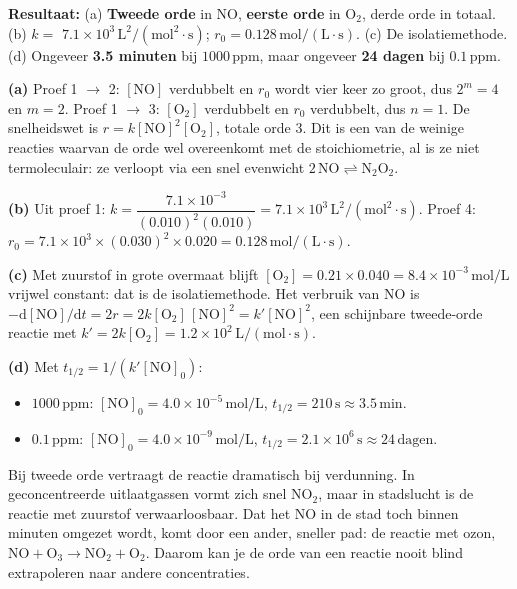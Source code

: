 \begin{oplossing}
\textbf{Resultaat:} (a) \textbf{Tweede orde} in NO, \textbf{eerste orde} in \(\mathrm{O_2}\), derde orde in totaal. (b) \(k =\) \textbf{\(7.1\times10^{3}\,\mathrm{L^2/(mol^2\cdot s)}\)}; \(r_0 = 0.128\,\mathrm{mol/(L\cdot s)}\). (c) De isolatiemethode. (d) Ongeveer \textbf{3.5 minuten} bij \(1000\,\mathrm{ppm}\), maar ongeveer \textbf{24 dagen} bij \(0.1\,\mathrm{ppm}\).

\textbf{(a)} Proef 1 \ensuremath{\rightarrow{}} 2: \([\mathrm{NO}]\) verdubbelt en \(r_0\) wordt vier keer zo groot, dus \(2^m = 4\) en \(m = 2\). Proef 1 \ensuremath{\rightarrow{}} 3: \([\mathrm{O_2}]\) verdubbelt en \(r_0\) verdubbelt, dus \(n = 1\). De snelheidswet is \(r = k[\mathrm{NO}]^2[\mathrm{O_2}]\), totale orde \(3\). Dit is een van de weinige reacties waarvan de orde wel overeenkomt met de stoichiometrie, al is ze niet termoleculair: ze verloopt via een snel evenwicht \(\mathrm{2\,NO \rightleftharpoons N_2O_2}\).

\textbf{(b)} Uit proef 1: \(k = \dfrac{7.1\times10^{-3}}{(0.010)^2(0.010)} = 7.1\times10^{3}\,\mathrm{L^2/(mol^2\cdot s)}\). Proef 4: \(r_0 = 7.1\times10^{3} \times (0.030)^2 \times 0.020 = 0.128\,\mathrm{mol/(L\cdot s)}\).

\textbf{(c)} Met zuurstof in grote overmaat blijft \([\mathrm{O_2}] = 0.21 \times 0.040 = 8.4\times10^{-3}\,\mathrm{mol/L}\) vrijwel constant: dat is de isolatiemethode. Het verbruik van NO is \(-\mathrm{d}[\mathrm{NO}]/\mathrm{d}t = 2r = 2k[\mathrm{O_2}]\,[\mathrm{NO}]^2 = k'[\mathrm{NO}]^2\), een schijnbare tweede-orde reactie met \(k' = 2k[\mathrm{O_2}] = 1.2\times10^{2}\,\mathrm{L/(mol\cdot s)}\).

\textbf{(d)} Met \(t_{1/2} = 1/(k'[\mathrm{NO}]_0)\):

\begin{itemize}
\item
  \(1000\,\mathrm{ppm}\): \([\mathrm{NO}]_0 = 4.0\times10^{-5}\,\mathrm{mol/L}\), \(t_{1/2} = 210\,\mathrm{s} \approx 3.5\,\mathrm{min}\).
\item
  \(0.1\,\mathrm{ppm}\): \([\mathrm{NO}]_0 = 4.0\times10^{-9}\,\mathrm{mol/L}\), \(t_{1/2} = 2.1\times10^{6}\,\mathrm{s} \approx 24\,\mathrm{dagen}\).
\end{itemize}

Bij tweede orde vertraagt de reactie dramatisch bij verdunning. In geconcentreerde uitlaatgassen vormt zich snel \(\mathrm{NO_2}\), maar in stadslucht is de reactie met zuurstof verwaarloosbaar. Dat het NO in de stad toch binnen minuten omgezet wordt, komt door een ander, sneller pad: de reactie met ozon, \(\mathrm{NO + O_3 \rightarrow NO_2 + O_2}\). Daarom kan je de orde van een reactie nooit blind extrapoleren naar andere concentraties.
\end{oplossing}

